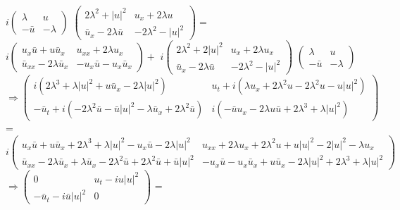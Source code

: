 \documentclass[12pt]{article}
\begin{document}
$i \begin{pmatrix} 
\lambda & u \\
-\bar{u} & -\lambda
\end{pmatrix}$ 
$ \begin{pmatrix} 
2\lambda^{2} + |u|^{2} & u_{x}+2\lambda u \\
\bar{u}_{x} -2\lambda\bar{u} & -2\lambda^{2} - |u|^{2}
\end{pmatrix} =$ 
$ i \begin{pmatrix} 
u_{x}\bar{u} + u\bar{u}_{x} & u_{xx} + 2\lambda u_{x} \\
\bar{u}_{xx} - 2 \lambda \bar{u}_{x} & -u_{x} \bar{u} - u_{x}\bar{u}_{x}
\end{pmatrix} +$ 
$i \begin{pmatrix} 
2 \lambda^{2} + 2|u|^{2} & u_{x} + 2\lambda u_{x} \\
\bar{u}_{x} - 2 \lambda \bar{u} & -2 \lambda^{2} - |u|^{2}
\end{pmatrix}$ 
$\begin{pmatrix} 
	\lambda & u \\
	- \bar{u} & - \lambda
\end{pmatrix}$
\\
$\Rightarrow \begin{pmatrix} 
	i(2 \lambda ^{3} + \lambda |u|^{2} + u\bar{u}_{x} -2\lambda |u|^{2}) & 
	u_{t} + i(\lambda u_{x} + 2 \lambda^{2} u - 2 \lambda^{2} u - u|u|^{2}) \\
	-\bar{u}_{t} + i(-2 \lambda^{2}\bar{u} - \bar{u}|u|^{2} - 
	\lambda\bar{u}_{x} + 2 \lambda^{2} \bar{u}) & i(-\bar{u} u_{x} - 2 \lambda 
	u \bar{u} + 2 \lambda^{3} + \lambda |u|^{2})
\end{pmatrix} $ = \\
$ i \begin{pmatrix} 
	u_{x}\bar{u} + u\bar{u}_{x} + 2 \lambda^{3} + \lambda |u|^{2} - 
	u_{x}\bar{u} - 2\lambda |u|^{2} & u_{xx} + 2\lambda u_{x} + 2\lambda^{2} u 
	+ u|u|^{2} - 2|u|^{2} - \lambda u_{x} \\
	\bar{u}_{xx} - 2\lambda \bar{u}_{x} + \lambda \bar{u}_{x} - 
	2\lambda^{2}\bar{u} + 2\lambda^{2}\bar{u} + \bar{u}|u|^{2} & -u_{x}\bar{u} 
	- u_{x}\bar{u}_{x} + u\bar{u}_{x} - 2\lambda |u|^{2} + 2\lambda^{3} + 
	\lambda |u|^{2}
\end{pmatrix}$ \\
$ \Rightarrow \begin{pmatrix} 
0 & u_{t} - iu|u|^{2} \\
-\bar{u}_{t} - i\bar{u}|u|^{2} & 0
\end{pmatrix} $ = 
\end{document}
